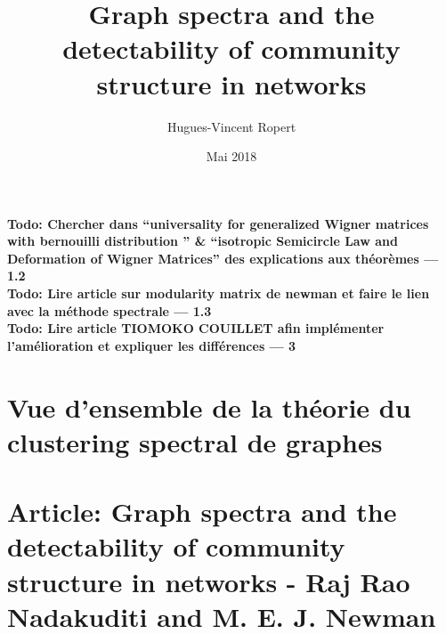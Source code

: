 \documentclass{article} %
\title{Graph spectra and the detectability of community structure in networks}
\author{Hugues-Vincent Ropert}
\date{Mai 2018}
\begin{document}
\maketitle

\textbf{Todo: Chercher dans ``universality for generalized Wigner matrices with bernouilli distribution '' \& ``isotropic Semicircle Law and Deformation of Wigner Matrices'' des explications aux théorèmes --- 1.2}\\

\textbf{Todo: Lire article sur modularity matrix de newman et faire le lien avec la méthode spectrale --- 1.3}\\

\textbf{Todo: Lire article TIOMOKO COUILLET afin implémenter l'amélioration et expliquer les différences --- 3}\\
\tableofcontents

\part{Vue d'ensemble de la théorie du clustering spectral de graphes}



\part{Article: Graph spectra and the detectability of community structure in networks - Raj Rao Nadakuditi and M. E. J. Newman}



\nocite{*}


\end{document}
